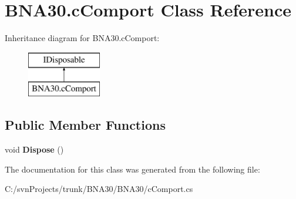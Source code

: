 \hypertarget{class_b_n_a30_1_1c_comport}{}\section{B\+N\+A30.\+c\+Comport Class Reference}
\label{class_b_n_a30_1_1c_comport}
Inheritance diagram for B\+N\+A30.\+c\+Comport\+:\begin{figure}[H]
\begin{center}
\leavevmode
\includegraphics[height=2.000000cm]{class_b_n_a30_1_1c_comport}
\end{center}
\end{figure}
\subsection*{Public Member Functions}
\begin{DoxyCompactItemize}
\item 
\mbox{\label{class_b_n_a30_1_1c_comport_ac15d372375192cfaa186830cdf8aae1e}} 
void {\bfseries Dispose} ()
\end{DoxyCompactItemize}


The documentation for this class was generated from the following file\+:\begin{DoxyCompactItemize}
\item 
C\+:/svn\+Projects/trunk/\+B\+N\+A30/\+B\+N\+A30/c\+Comport.\+cs\end{DoxyCompactItemize}
